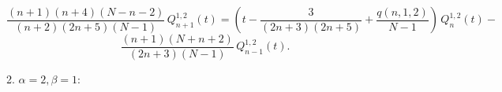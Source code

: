 \documentclass[12pt]{book}
\begin{document}

\begin{equation*}
    \frac{(n+1)(n+4)(N-n-2)}{(n+2)(2n+5)(N-1)} \, Q^{1,2}_{n+1}(t) =
    \left(t-
    \frac{3}{(2n+3)(2n+5)}+\frac{q(n,1,2)}{N-1}
    \right)\,
    Q^{1,2}_{n}(t) -
\end{equation*}
\begin{equation}\label{34}
    \frac{(n+1)(N+n+2)}{(2n+3)(N-1)}\,
    Q^{1,2}_{n-1}(t).
\end{equation}




2. $\alpha=2, \beta=1$:

\end{document}
